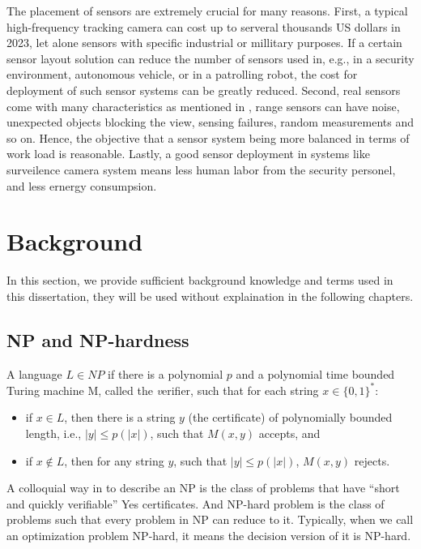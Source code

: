 The placement of sensors are extremely crucial for many reasons.
First, a typical high-frequency tracking camera can cost up to serveral thousands US dollars in 2023, 
let alone sensors with specific industrial or millitary purposes. If a certain sensor layout solution
can reduce the number of sensors used in, e.g., in a security environment, autonomous vehicle, or in a patrolling robot,
the cost for deployment of such sensor systems can be greatly reduced.
Second, real sensors come with many characteristics as mentioned in \cite{sebastian2005prob},
range sensors can have noise, unexpected objects blocking the view, sensing failures, random measurements and so on.
Hence, the objective that a sensor system being more balanced in terms of work load is reasonable.
Lastly, a good sensor deployment in systems like surveilence camera system means less human labor from the security personel,
and less ernergy consumpsion.
\section{Background}
In this section, we provide sufficient background knowledge and terms used in this dissertation, 
they will be used without explaination in the following chapters. 

\subsection{NP and NP-hardness}
\begin{definition}[NP]
    A language $L\in NP$ if there is a polynomial $p$ and a polynomial time bounded Turing machine M, 
    called the {\textit verifier}, such that for each string $x\in \{0, 1\}^*$: 
    \begin{itemize}
        \item if $x\in L$, then there is a string $y$ (the certificate) of polynomially bounded length, i.e., $|y| \leq p(|x|)$,
        such that $M(x, y)$ accepts, and 
        \item if $x\notin L$, then for any string $y$, such that $|y|\leq p(|x|)$, $M(x,y)$ rejects.
    \end{itemize}
\end{definition}

A colloquial way in \cite{vazirani2001approximation} to describe an NP is the class of problems that have ``short and quickly verifiable''
Yes certificates.
And NP-hard problem is the class of problems such that every problem in NP can reduce to it.
Typically, when we call an optimization problem NP-hard, it means the decision version of it is NP-hard.
